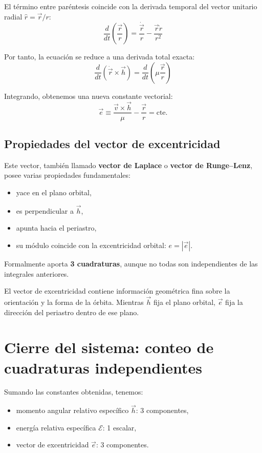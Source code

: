 El término entre paréntesis coincide con la derivada temporal del vector unitario radial \(\hat{r} = \vec{r}/r\):
\[
\frac{d}{dt}\left(\frac{\vec{r}}{r}\right) = \frac{\dot{\vec{r}}}{r} - \frac{\vec{r}\dot{r}}{r^2}
\]

Por tanto, la ecuación se reduce a una derivada total exacta:
\[
\frac{d}{dt}(\dot{\vec{r}} \times \vec{h}) = \frac{d}{dt}\left(\mu\frac{\vec{r}}{r}\right)
\]

Integrando, obtenemos una nueva constante vectorial:
\[
\vec{e} \equiv \frac{\vec{v} \times \vec{h}}{\mu} - \frac{\vec{r}}{r} = \text{cte.}
\]

\subsection{Propiedades del vector de excentricidad}
Este vector, también llamado \textbf{vector de Laplace} o \textbf{vector de Runge--Lenz}, posee varias propiedades fundamentales:
\begin{itemize}
    \item yace en el plano orbital,
    \item es perpendicular a \(\vec{h}\),
    \item apunta hacia el periastro,
    \item su módulo coincide con la excentricidad orbital: \(e = |\vec{e}|\).
\end{itemize}

Formalmente aporta \textbf{3 cuadraturas}, aunque no todas son independientes de las integrales anteriores.

\begin{importante}
El vector de excentricidad contiene información geométrica fina sobre la orientación y la forma de la órbita. Mientras \(\vec{h}\) fija el plano orbital, \(\vec{e}\) fija la dirección del periastro dentro de ese plano.
\end{importante}

\section{Cierre del sistema: conteo de cuadraturas independientes}
Sumando las constantes obtenidas, tenemos:
\begin{itemize}
    \item momento angular relativo específico \(\vec{h}\): 3 componentes,
    \item energía relativa específica \(\mathcal{E}\): 1 escalar,
    \item vector de excentricidad \(\vec{e}\): 3 componentes.
\end{itemize}

